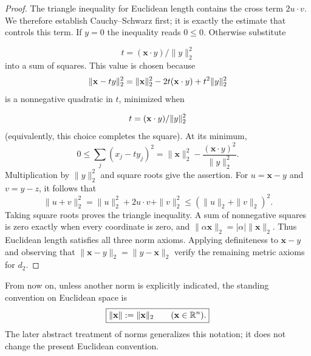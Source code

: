 \begin{proof}
The triangle inequality for Euclidean length contains the cross term
$2u\cdot v$. We therefore establish Cauchy--Schwarz first; it is exactly
the estimate that controls this term.
If $y=0$ the inequality reads $0\leq0$. Otherwise substitute

\[
t=(\mathbf{x}\cdot y)/\|y\|_2^2
\]
 into a sum of squares. This value is chosen
because
\[
\lVert \mathbf{x}-ty\rVert_2^2
=\lVert \mathbf{x}\rVert_2^2-2t(\mathbf{x}\cdot y)+t^2\lVert y\rVert_2^2
\]
is a nonnegative quadratic in $t$, minimized when

\[
t=(\mathbf{x}\cdot y)/\lVert y\rVert_2^2
\]
 (equivalently, this choice completes the
square). At its minimum,
\[
0\leq\sum_j(x_j-ty_j)^2
=\|\mathbf{x}\|_2^2-\frac{(\mathbf{x}\cdot y)^2}{\|y\|_2^2}.
\]
Multiplication by $\|y\|_2^2$ and square roots give the assertion. For
$u=\mathbf{x}-y$ and $v=y-z$, it follows that
\[
\|u+v\|_2^2=\|u\|_2^2+2u\cdot v+\|v\|_2^2
\leq(\|u\|_2+\|v\|_2)^2.
\]
Taking square roots proves the triangle inequality. A sum of nonnegative
squares is zero exactly when every coordinate is zero, and
$\|\alpha \mathbf{x}\|_2=|\alpha|\|\mathbf{x}\|_2$. Thus Euclidean length satisfies all
three norm axioms. Applying definiteness to $\mathbf{x}-y$ and observing that
$\|\mathbf{x}-y\|_2=\|y-\mathbf{x}\|_2$ verify the remaining metric axioms for $d_2$.
\end{proof}

From now on, unless another norm is explicitly indicated, the standing
convention on Euclidean space is
\[
\boxed{\|\mathbf{x}\|:=\|\mathbf{x}\|_2\qquad(\mathbf{x}\in\mathbb{R}^n).}
\]
The later abstract treatment of norms generalizes this notation; it does
not change the present Euclidean convention.

